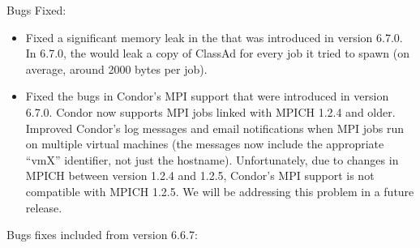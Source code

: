 \noindent Bugs Fixed:

\begin{itemize}

\item Fixed a significant memory leak in the  that was
  introduced in version 6.7.0.
  In 6.7.0, the  would leak a copy of ClassAd for every
  job it tried to spawn (on average, around 2000 bytes per job).

\item Fixed the bugs in Condor's MPI support that were introduced in
  version 6.7.0.
  Condor now supports MPI jobs linked with MPICH 1.2.4 and older.
  Improved Condor's log messages and email notifications when MPI jobs
  run on multiple virtual machines (the messages now include the
  appropriate ``vmX'' identifier, not just the hostname).
  Unfortunately, due to changes in MPICH between version 1.2.4 and
  1.2.5, Condor's MPI support is not compatible with MPICH 1.2.5.
  We will be addressing this problem in a future release.

\end{itemize}

\noindent Bugs fixes included from version 6.6.7:

